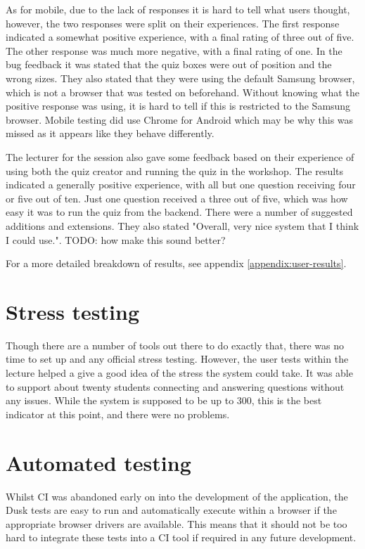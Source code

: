 As for mobile, due to the lack of responses it is hard to tell what users thought, however, the two responses were split on their experiences. The first response indicated a somewhat positive experience, with a final rating of three out of five. The other response was much more negative, with a final rating of one. In the bug feedback it was stated that the quiz boxes were out of position and the wrong sizes. They also stated that they were using the default Samsung browser, which is not a browser that was tested on beforehand. Without knowing what the positive response was using, it is hard to tell if this is restricted to the Samsung browser. Mobile testing did use Chrome for Android which may be why this was missed as it appears like they behave differently.

The lecturer for the session also gave some feedback based on their experience of using both the quiz creator and running the quiz in the workshop. The results indicated a generally positive experience, with all but one question receiving four or five out of ten. Just one question received a three out of five, which was how easy it was to run the quiz from the backend. There were a number of suggested additions and extensions. They also stated "Overall, very nice system that I think I could use.". TODO: how make this sound better?

For a more detailed breakdown of results, see appendix \ref{appendix:user-results}.

\section{Stress testing}
Though there are a number of tools out there to do exactly that, there was no time to set up and any official stress testing. However, the user tests within the lecture helped a give a good idea of the stress the system could take. It was able to support about twenty students connecting and answering questions without any issues. While the system is supposed to be up to 300, this is the best indicator at this point, and there were no problems.

\section{Automated testing}
Whilst CI was abandoned early on into the development of the application, the Dusk tests are easy to run and automatically execute within a browser if the appropriate browser drivers are available. This means that it should not be too hard to integrate these tests into a CI tool if required in any future development.